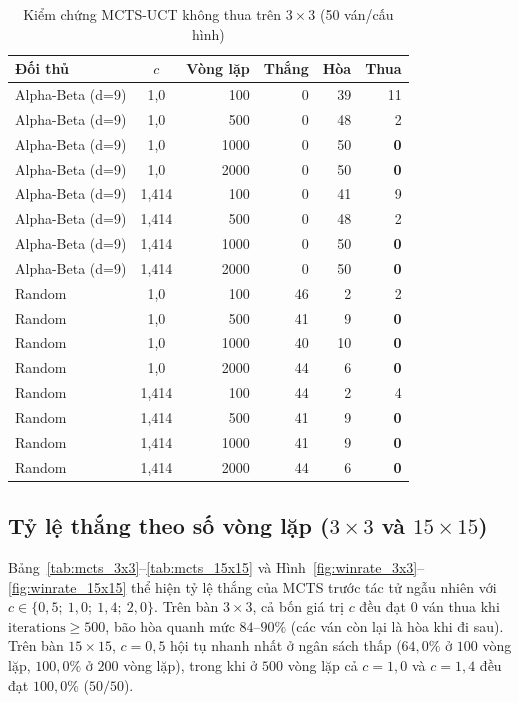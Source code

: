 \documentclass[conference]{IEEEtran}
\begin{document}
\begin{table}[t]
\centering
\caption{Kiểm chứng MCTS-UCT không thua trên $3\times 3$ (50 ván/cấu hình)}
\label{tab:never_lose}
\begin{tabular}{@{}lcrrrr@{}}
\toprule
Đối thủ & $c$ & Vòng lặp & Thắng & Hòa & Thua \\
\midrule
Alpha-Beta (d=9) & 1,0 & 100 & 0 & 39 & 11 \\
Alpha-Beta (d=9) & 1,0 & 500 & 0 & 48 & 2 \\
Alpha-Beta (d=9) & 1,0 & 1000 & 0 & 50 & \textbf{0} \\
Alpha-Beta (d=9) & 1,0 & 2000 & 0 & 50 & \textbf{0} \\
Alpha-Beta (d=9) & 1,414 & 100 & 0 & 41 & 9 \\
Alpha-Beta (d=9) & 1,414 & 500 & 0 & 48 & 2 \\
Alpha-Beta (d=9) & 1,414 & 1000 & 0 & 50 & \textbf{0} \\
Alpha-Beta (d=9) & 1,414 & 2000 & 0 & 50 & \textbf{0} \\
\midrule
Random & 1,0 & 100 & 46 & 2 & 2 \\
Random & 1,0 & 500 & 41 & 9 & \textbf{0} \\
Random & 1,0 & 1000 & 40 & 10 & \textbf{0} \\
Random & 1,0 & 2000 & 44 & 6 & \textbf{0} \\
Random & 1,414 & 100 & 44 & 2 & 4 \\
Random & 1,414 & 500 & 41 & 9 & \textbf{0} \\
Random & 1,414 & 1000 & 41 & 9 & \textbf{0} \\
Random & 1,414 & 2000 & 44 & 6 & \textbf{0} \\
\bottomrule
\end{tabular}
\end{table}

\subsection{Tỷ lệ thắng theo số vòng lặp ($3\times 3$ và $15\times 15$)}
Bảng~\ref{tab:mcts_3x3}--\ref{tab:mcts_15x15} và Hình~\ref{fig:winrate_3x3}--\ref{fig:winrate_15x15} thể hiện tỷ lệ thắng của MCTS trước tác tử ngẫu nhiên với $c \in \{0{,}5;\ 1{,}0;\ 1{,}4;\ 2{,}0\}$. Trên bàn $3\times 3$, cả bốn giá trị $c$ đều đạt $0$ ván thua khi $\text{iterations} \ge 500$, bão hòa quanh mức $84$--$90\%$ (các ván còn lại là hòa khi đi sau). Trên bàn $15\times 15$, $c = 0{,}5$ hội tụ nhanh nhất ở ngân sách thấp ($64{,}0\%$ ở $100$ vòng lặp, $100{,}0\%$ ở $200$ vòng lặp), trong khi ở $500$ vòng lặp cả $c = 1{,}0$ và $c = 1{,}4$ đều đạt $100{,}0\%$ ($50/50$).
\end{document}

